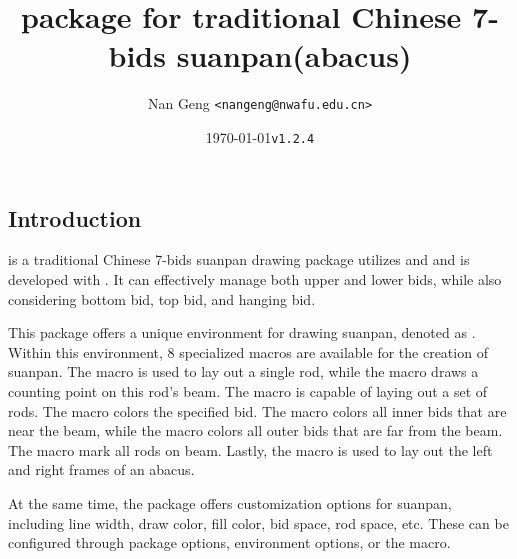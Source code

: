 \documentclass[full]{l3doc}
\def\vers{\texttt{v1.2.4} }
\begin{document}
\begin{documentation}
\bigskip


\title{
   package for traditional Chinese 7-bids suanpan(abacus)
}
\author{Nan Geng \texttt{<nangeng@nwafu.edu.cn>}}
\date{\today\qquad \vers}

\maketitle

\section{Introduction}

 is a traditional Chinese 7-bids suanpan drawing package
utilizes  and  and is developed with .
It can effectively manage both upper and lower bids, while also considering
bottom bid, top bid, and hanging bid.

This package offers a unique environment for drawing suanpan,
denoted as . Within this environment, 8 specialized macros
are available for the creation of suanpan. The  macro is used
to lay out a single rod, while the  macro draws a counting point
on this rod’s beam. The  macro is capable of laying out a set of rods.
The  macro colors the specified bid. The  macro colors
all inner bids that are near the beam, while the  macro colors
all outer bids that are far from the beam. The  macro mark all rods
on beam. Lastly, the  macro
is used to lay out the left and right frames of an abacus.

At the same time, the package offers customization options for suanpan,
including line width, draw color, fill color, bid space, rod space, etc.
These can be configured through package options,  environment
options, or the  macro.

\begin{center}
  \begin{suanpan}[framedraw = brown2, scale = 0.45, bidsep=1.5pt,
                  roddraw = brown3, rodfill = brown4]
    \mkframe
  \end{suanpan}
\end{center}


\end{documentation}
\end{document}
